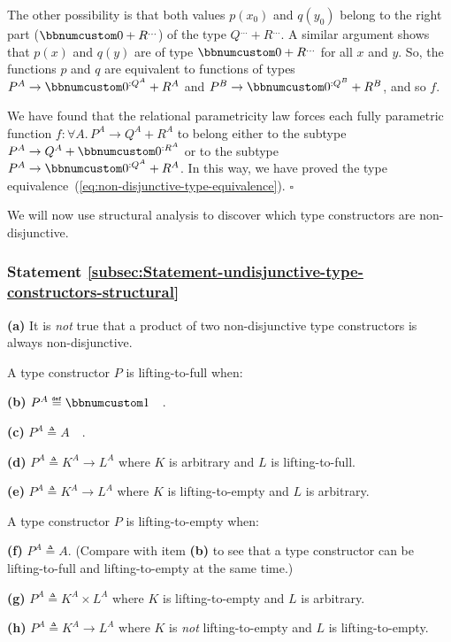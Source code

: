 The other possibility is that both values $p(x_{0})$ and $q(y_{0})$
belong to the right part ($\bbnum 0+R^{...}$) of the type $Q^{...}+R^{...}$.
A similar argument shows that $p(x)$ and $q(y)$ are of type $\bbnum 0+R^{...}$
for all $x$ and $y$. So, the functions $p$ and $q$ are equivalent
to functions of types $P^{A}\rightarrow\bbnum 0^{:Q^{A}}+R^{A}$ and
$P^{B}\rightarrow\bbnum 0^{:Q^{B}}+R^{B}$, and so $f$.

We have found that the relational parametricity law forces each fully
parametric function $f:\forall A.\,P^{A}\rightarrow Q^{A}+R^{A}$
to belong either to the subtype $P^{A}\rightarrow Q^{A}+\bbnum 0^{:R^{A}}$
or to the subtype $P^{A}\rightarrow\bbnum 0^{:Q^{A}}+R^{A}$. In this
way, we have proved the type equivalence~(\ref{eq:non-disjunctive-type-equivalence}).
$\square$

We will now use structural analysis to discover which type constructors
are non-disjunctive.

\subsubsection{Statement \label{subsec:Statement-undisjunctive-type-constructors-structural}\ref{subsec:Statement-undisjunctive-type-constructors-structural}}

\textbf{(a)} It is \emph{not} true that a product of two non-disjunctive
type constructors is always non-disjunctive.

A type constructor $P$ is lifting-to-full when:

\textbf{(b)} $P^{A}\triangleq\bbnum 1$$\quad$.

\textbf{(c)} $P^{A}\triangleq A$$\quad$.

\textbf{(d)} $P^{A}\triangleq K^{A}\rightarrow L^{A}$ where $K$
is arbitrary and $L$ is lifting-to-full.

\textbf{(e)} $P^{A}\triangleq K^{A}\rightarrow L^{A}$ where $K$
is lifting-to-empty and $L$ is arbitrary.

A type constructor $P$ is lifting-to-empty when:

\textbf{(f)} $P^{A}\triangleq A$. (Compare with item \textbf{(b)}
to see that a type constructor can be lifting-to-full and lifting-to-empty
at the same time.)

\textbf{(g)} $P^{A}\triangleq K^{A}\times L^{A}$ where $K$ is lifting-to-empty
and $L$ is arbitrary.

\textbf{(h)} $P^{A}\triangleq K^{A}\rightarrow L^{A}$ where $K$
is \emph{not} lifting-to-empty and $L$ is lifting-to-empty.

